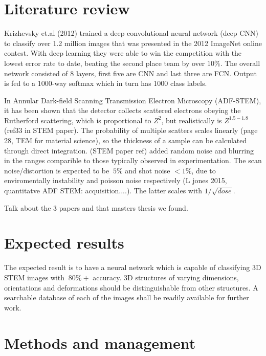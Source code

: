 \documentclass{cookedoc}
\begin{document}
	\section{Literature review}
	
	Krizhevsky et.al (2012) trained a deep convolutional neural network (deep CNN) to classify over 1.2 million images that was presented in the 2012 ImageNet online contest. With deep learning they were able to win the competition with the lowest error rate to date, beating the second place team by over $10\%$. The overall network consisted of 8 layers, first five are CNN and last three are FCN. Output is fed to a 1000-way softmax which in turn has 1000 class labels.	
	
	In Annular Dark-field Scanning Transmission Electron Microscopy (ADF-STEM), it has been shown that the detector collects scattered electrons obeying the Rutherford scattering, which is proportional to $Z^2$, but realistically is $Z^{1.5-1.8}$ (ref33 in STEM paper). The probability of multiple scatters scales linearly (page 28, TEM for material science), so the thickness of a sample can be calculated through direct integration. 	(STEM paper ref) added random noise and blurring in the ranges comparible to those typically observed in experimentation. The scan noise/distortion is expected to be $~5\%$ and shot noise $<1\%$, due to enviromentally instability and poisson noise respectively (L jones 2015, quantitatve ADF STEM: acquisition....). The latter scales with $1/\sqrt{dose}$. 
	
	Talk about the 3 papers and that masters thesis we found.
	
	
	
	
	
	\section{Expected results}
	
	The expected result is to have a neural network which is capable of classifying 3D STEM images with $~80\% +$ accuracy. 3D structures of varying dimensions, orientations and deformations should be distinguishable from other structures. A searchable database of each of the images shall be readily available for further work. 
	
	
	
	\section{Methods and management}
	
\end{document}
